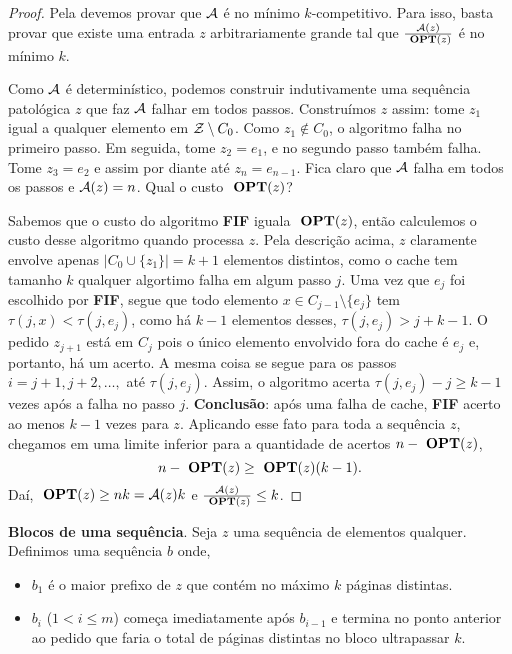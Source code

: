 \begin{proof}

  Pela  devemos provar que \(\mathcal{A}\) é no mínimo \(k\)-competitivo. Para isso, basta provar que existe uma entrada \(z\) arbitrariamente grande tal que \(\frac{\mathcal{A}(z)} {\ \textbf{OPT}(z)}\) é no mínimo \(k\). 

  Como \(\mathcal{A}\) é determinístico, podemos construir indutivamente uma sequência patológica \(z\) que faz \(\mathcal{A}\) falhar em todos passos. Construímos \(z\) assim: tome \(z_1\) igual a qualquer elemento em \(\mathcal{Z} \setminus C_0\). Como \(z_1 \notin C_0\), o algoritmo falha no primeiro passo. Em seguida, tome \(z_2 = e_1\), e no segundo passo também falha. Tome \(z_3 = e_2\) e assim por diante até \(z_n = e_{n-1}\). Fica claro que \(\mathcal{A}\) falha em todos os passos e \(\mathcal{A}(z) = n\). Qual o custo \(\ \textbf{OPT}(z)\)?

  Sabemos que o custo do algoritmo \textbf{FIF} iguala \(\ \textbf{OPT}(z)\), então calculemos o custo desse algoritmo quando processa \(z\). Pela descrição acima, \(z\) claramente envolve apenas \(|C_0 \cup \{z_1\}| = k+1\) elementos distintos, como o cache tem tamanho \(k\) qualquer algortimo falha em algum passo \(j\). Uma vez que \(e_j\) foi escolhido por \textbf{FIF}, segue que todo elemento \(x \in C_{j-1} \setminus \{e_j\}\) tem \(\tau(j,x) < \tau(j, e_j)\), como há \(k-1\) elementos desses, \(\tau(j, e_j) > j + k-1\). O pedido \(z_{j+1}\) está em \(C_j\) pois o único elemento envolvido fora do cache é \(e_j\) e, portanto, há um acerto. A mesma coisa se segue para os passos \(i = j+1, j+2, \dotsc,\) até \(\tau(j,e_j)\). Assim, o algoritmo acerta \(\tau(j, e_j) - j \ge k-1\) vezes após a falha no passo \(j\). \textbf{Conclusão}: após uma falha de cache, \textbf{FIF} acerto ao menos \(k-1\) vezes para \(z\). Aplicando esse fato para toda a sequência \(z\), chegamos em uma limite inferior para a quantidade de acertos \(n-\ \textbf{OPT}(z)\),
\begin{equation*}
  n - \ \textbf{OPT}(z) \ge \ \textbf{OPT}(z)(k-1).
\end{equation*}
Daí, \(\ \textbf{OPT}(z) \ge nk = \mathcal{A}(z)k\) e \(\frac{\mathcal{A}(z)}{\ \textbf{OPT}(z)} \le k\).

\end{proof}

\begin{definition}

  \textbf{Blocos de uma sequência}. Seja \(z\) uma sequência de elementos qualquer. Definimos uma sequência \(b\) onde,
\begin{itemize}
    \item \(b_1\) é o maior prefixo de \(z\) que contém no máximo \(k\) páginas distintas.
    \item \(b_i\) (\(1 < i \le m\)) começa imediatamente após \(b_{i-1}\) e termina no ponto anterior ao pedido que faria o total de páginas distintas no bloco ultrapassar \(k\). 
\end{itemize}

\end{definition}

